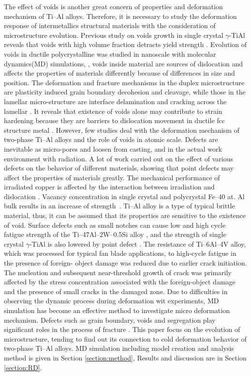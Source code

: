 \documentclass[materials,article,accept,moreauthors,pdftex,10pt,a4paper]{Definitions/mdpi}
\begin{document}
The effect of voids is another great concern of properties and deformation mechanism  of Ti--Al alloys.  Therefore, it is necessary to study the deformation response of intermetallics structural materials with the consideration of microstructure evolution. Previous study on voids growth in single crystal $\gamma$-TiAl reveals that voids with high volume fraction detracts yield strength \cite{Tang2014, Xu2011}. Evolution of voids in ductile polycrystalline was studied in nanoscale with molecular dynamics(MD) simulations, \cite{Jing2018a,Elkhateeb2018}, voids inside material are sources of dislocation and affects the properties of materials differently because of differences in size and position.  The deformation and fracture mechanisms in the duplex microstructure are plasticity induced grain boundary decohesion and cleavage, while those in the lamellar micro-structure are interface delamination and cracking across the lamellar \cite{Tang2014}. It reveals that existence of voids alone may contribute to strain hardening because they are barriers to dislocation movement in ductile fcc structure metal \cite{Xiong2015}. However, few studies deal with the deformation mechanism of two-phase Ti--Al alloys and the role of voids in atomic scale. Defects are inevitable as micro-pores and loosen from casting, and in the actual work environment with radiation. A lot of work carried out on the  effect of various defects on the behavior of different materials, showing that point defects may affect the properties of materials greatly. The mechanical performance of irradiated copper is affected by the interaction between irradiation and dislocation \cite{Kiener2011b}. Vacancy concentration in single crystal and polycrystal Fe–40 at. Al bulk results in an increase of strength~\cite{Yang1998}. Ti--Al alloy is a type of typical brittle material, thus, it can be assumed that its properties are sensitive to the existence of void. Surface defects such as small notches can cause low and high cycle fatigue strength of the Ti–47Al–2W–0.5Si alloy \cite{Nazmy2001}, and the strength of single crystal $\gamma$-TiAl is also lowered by point defect \cite{Wu2016}. The resistance of Ti–6Al–4V alloy, which was processed for typical fan blade applications, to high-cycle fatigue in the presence of foreign- object damage was reduced due to earlier crack initiation.  The nucleation and subsequent near-threshold growth of crack was primarily affected by the stress concentration associated with the foreign-object damage and the presence of small cracks in the damaged zone. Due to difficulties in observing the dynamic process during deformation wit experiments, MD simulation has become an effective method to investigate micro deformation mechanism. Defects such as grain boundary, voids and segregation play significant roles in the process of fracture \cite{Larsen2016}. This paper focus on the evolution of microstructure, tending to find out its connection to cold deformation behavior of two-phase Ti--Al alloys. MD simulation including model creation and analysis method is given in Section \ref{section:method}, Results and discussion are in Section \ref{section:RD}.
\end{document}
